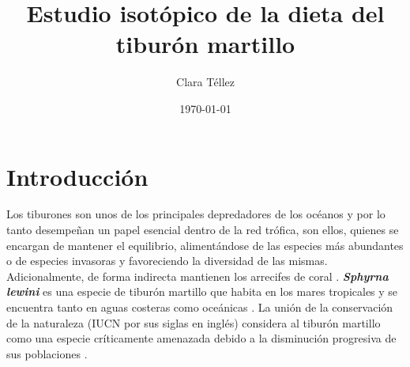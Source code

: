 \documentclass[12pt, letterpaper] {article}
\author{Clara T\'ellez \\[0.9mm]}
\title{Estudio isot\'opico de la dieta del tibur\'on martillo}
\date{\today}
\begin{document}

\section{Introducción}
Los tiburones son unos de los principales depredadores de los oc\'eanos y por lo tanto desempe\~nan un papel esencial dentro de la red tr\'ofica, son ellos, quienes se encargan de mantener el equilibrio, aliment\'andose de las especies m\'as abundantes o de especies invasoras y favoreciendo la diversidad de las mismas.  Adicionalmente, de forma indirecta mantienen los arrecifes de coral \cite{Clarke}.   \textbf{\textit{Sphyrna lewini}} es una especie de tibur\'on martillo que habita en los mares tropicales y se encuentra tanto en aguas costeras como oce\'anicas \cite{Duncan}.  La uni\'on de la conservaci\'on de la naturaleza (IUCN por sus siglas en ingl\'es) considera al tibur\'on martillo como una especie cr\'iticamente amenazada debido a la disminuci\'on progresiva de sus poblaciones \cite{IUCN}.  
\end{document}
